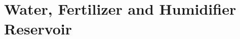 \documentclass[../../main]{subfiles}
\begin{document}
\section{Water, Fertilizer and Humidifier Reservoir} \label{sec:}
\end{document}
